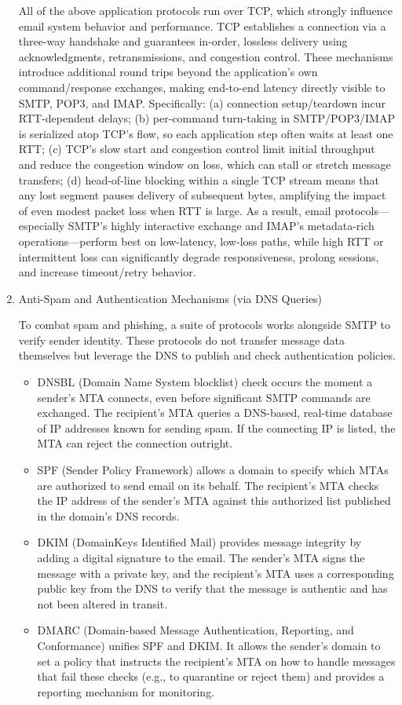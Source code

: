 \begin{enumerate}
  All of the above application protocols run over TCP, which strongly influence email system behavior and performance. TCP establishes a connection via a three-way handshake and guarantees in-order, lossless delivery using acknowledgments, retransmissions, and congestion control. These mechanisms introduce additional round trips beyond the application’s own command/response exchanges, making end-to-end latency directly visible to SMTP, POP3, and IMAP. Specifically: (a) connection setup/teardown incur RTT-dependent delays; (b) per-command turn-taking in SMTP/POP3/IMAP is serialized atop TCP’s flow, so each application step often waits at least one RTT; (c) TCP’s slow start and congestion control limit initial throughput and reduce the congestion window on loss, which can stall or stretch message transfers; (d) head-of-line blocking within a single TCP stream means that any lost segment pauses delivery of subsequent bytes, amplifying the impact of even modest packet loss when RTT is large. As a result, email protocols—especially SMTP’s highly interactive exchange and IMAP’s metadata-rich operations—perform best on low-latency, low-loss paths, while high RTT or intermittent loss can significantly degrade responsiveness, prolong sessions, and increase timeout/retry behavior.

  \item Anti-Spam and Authentication Mechanisms (via DNS Queries)

  To combat spam and phishing, a suite of protocols works alongside SMTP to verify sender identity. These protocols do not transfer message data themselves but leverage the DNS to publish and check authentication policies. 
  \begin{itemize}
    \item DNSBL (Domain Name System blocklist) check occurs the moment a sender's MTA connects, even before significant SMTP commands are exchanged. The recipient's MTA queries a DNS-based, real-time database of IP addresses known for sending spam. If the connecting IP is listed, the MTA can reject the connection outright.
    \item SPF (Sender Policy Framework) allows a domain to specify which MTAs are authorized to send email on its behalf. The recipient's MTA checks the IP address of the sender's MTA against this authorized list published in the domain’s DNS records. 
    \item DKIM (DomainKeys Identified Mail) provides message integrity by adding a digital signature to the email. The sender's MTA signs the message with a private key, and the recipient's MTA uses a corresponding public key from the DNS to verify that the message is authentic and has not been altered in transit. 
    \item DMARC (Domain-based Message Authentication, Reporting, and Conformance) unifies SPF and DKIM. It allows the sender's domain to set a policy that instructs the recipient's MTA on how to handle messages that fail these checks (e.g., to quarantine or reject them) and provides a reporting mechanism for monitoring.
  \end{itemize}
\end{enumerate}

